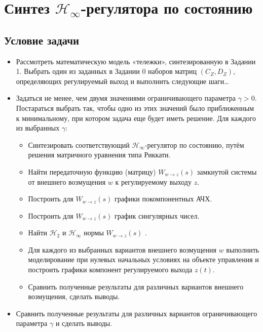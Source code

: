 \chapter{Синтез $\mathcal{H}_\infty$-регулятора по состоянию}
\label{ch:chap4}
\section{Условие задачи}

\begin{itemize}
    \item Рассмотреть математическую модель «тележки», синтезированную в Задании 1. 
    Выбрать один из заданных в Задании 0 наборов матриц $(C_Z,D_Z)$, 
    определяющих регулируемый выход и выполнить следующие шаги\dots
    \item  Задаться не менее, чем двумя значениями ограничивающего параметра $\gamma > 0$.
    Постараться выбрать так, чтобы одно из этих значений было приближенным к
    минимальному, при котором задача еще будет иметь решение. 
    Для каждого из выбранных $\gamma$:
    \begin{itemize}
        \item Синтезировать соответствующий $\mathcal{H}_\infty$-регулятор по состоянию, путём решения матричного уравнения типа Риккати.
        \item Найти передаточную функцию (матрицу) $W_{w\rightarrow z}(s)$ 
        замкнутой системы от внешнего возмущения $w$ к регулируемому выходу $z$.
        \item Построить для  $W_{w\rightarrow z}(s)$  графики покомпонентных АЧХ.
        \item Построить для  $W_{w\rightarrow z}(s)$  график сингулярных чисел.
        \item Найти $\mathcal{H}_2$ и $\mathcal{H}_\infty$ нормы  $W_{w\rightarrow z}(s)$ .
        \item Для каждого из выбранных вариантов внешнего возмущения $w$ выполнить моделирование при нулевых начальных условиях
        на объекте управления и построить графики компонент регулируемого выхода $z(t)$.
        \item Сравнить полученные результаты для различных вариантов внешнего возмущения, сделать выводы.
    \end{itemize}
   \item Сравнить полученные результаты для различных вариантов ограничивающего параметра $\gamma$ и сделать выводы.
\end{itemize}





